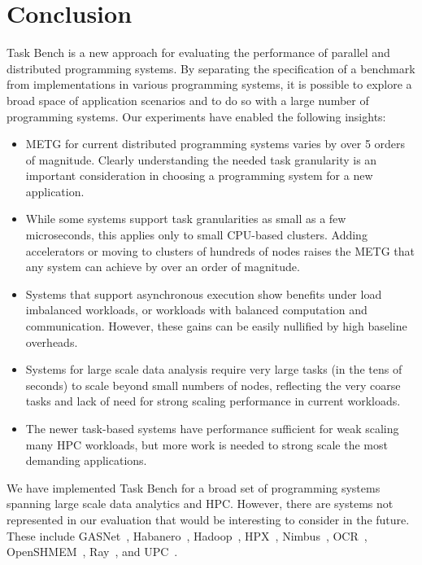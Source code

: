 \section{Conclusion}
\label{sec:conclusion}

Task Bench is a new approach for evaluating the performance of
parallel and distributed programming systems. By separating the
specification of a benchmark from implementations in various
programming systems, it is possible to explore a broad space of
application scenarios and to do so with a large number of programming
systems. Our experiments have enabled the following
insights:

\begin{itemize}

\item METG for current distributed programming systems varies by over
  5 orders of magnitude.  Clearly understanding the needed task
  granularity is an important consideration in choosing a programming
  system for a new application.

\item While some systems support task granularities as small as a few
  microseconds, this applies only to small CPU-based clusters. Adding
  accelerators or moving to clusters of hundreds of nodes raises the
  METG that any system can achieve by over an order of magnitude.

\item Systems that support asynchronous execution show benefits under
  load imbalanced workloads, or workloads with balanced computation
  and communication. However, these gains can be easily nullified by
  high baseline overheads.

\item Systems for large scale data analysis require very large tasks
  (in the tens of seconds) to scale beyond small numbers of nodes,
  reflecting the very coarse tasks and lack of need for strong scaling
  performance in current workloads.

\item The newer task-based systems have performance sufficient for
  weak scaling many HPC workloads, but more work is needed to strong
  scale the most demanding applications.

\end{itemize}

We have implemented Task Bench for a broad set of programming systems
spanning large scale data analytics and HPC. However, there are
systems not represented in our evaluation that would be interesting to
consider in the future. These include GASNet~\cite{GASNET07},
Habanero~\cite{Habanero11}, Hadoop~\cite{Hadoop},
HPX~\cite{Kaiser2014}, Nimbus~\cite{Nimbus17}, OCR~\cite{OCR14},
OpenSHMEM~\cite{OpenSHMEM10}, Ray~\cite{Ray18}, and UPC~\cite{UPC99}.


